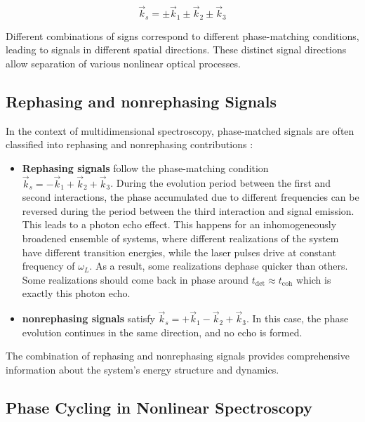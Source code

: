 \begin{equation}
	\vec{k}_s = \pm\vec{k}_1 \pm\vec{k}_2 \pm\vec{k}_3
	\label{eq:fwm_phase_matching}
\end{equation}

\noindent 
Different combinations of signs correspond to different phase-matching conditions, leading to signals in different spatial directions. These distinct signal directions allow separation of various nonlinear optical processes.


\subsection{Rephasing and nonrephasing Signals}
\label{subsec:rephasing_nonrephasing}

\noindent 
In the context of multidimensional spectroscopy, phase-matched signals are often classified into rephasing and nonrephasing contributions \cite{cho2009twodimensionalopticalspectroscopy, jonas2003twodimensionalfemtosecondspectroscopy}:

\begin{itemize}
	\item \textbf{Rephasing signals} follow the phase-matching condition $\vec{k}_s = -\vec{k}_1 + \vec{k}_2 + \vec{k}_3$. During the evolution period between the first and second interactions, the phase accumulated due to different frequencies can be reversed during the period between the third interaction and signal emission. This leads to a photon echo effect.
 	This happens for an inhomogeneously broadened ensemble of systems, where different realizations of the system have different transition energies, while the laser pulses drive at constant frequency of $\omega_L$. As a result, some realizations dephase quicker than others. Some realizations should come back in phase around $t_{\text{det}} \approx t_{\text{coh}}$ which is exactly this photon echo.


	\item \textbf{nonrephasing signals} satisfy $\vec{k}_s = +\vec{k}_1 - \vec{k}_2 + \vec{k}_3$. In this case, the phase evolution continues in the same direction, and no echo is formed.
\end{itemize}

\noindent 
The combination of rephasing and nonrephasing signals provides comprehensive information about the system's energy structure and dynamics.


\subsection{Phase Cycling in Nonlinear Spectroscopy}
\label{subsec:phase_cycling}

